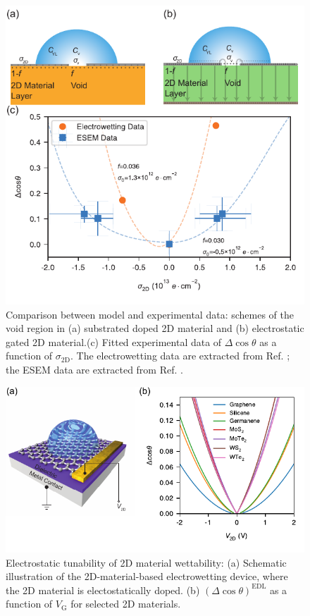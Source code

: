 \documentclass[journal=ancac3,manuscript=article,email=true,hyperref=true,keywords=true]{achemso}
\begin{document}
\begin{figure}[htbp]
\centering
\includegraphics[width=0.95\linewidth]{../img/plot-fitting.pdf}
\caption{\label{fig:f-nc-exp}
Comparison between model and experimental data: schemes of the void region in (a) substrated doped 2D material and (b) electrostatic gated 2D material.(c) Fitted experimental data of \(\Delta\cos\theta\) as a function of \(\sigma_{\mathrm{2D}}\). The electrowetting data are extracted from Ref. ; the ESEM data are extracted from Ref. .}
\end{figure}


\begin{figure}[htbp]
\centering
\includegraphics[width=0.65\linewidth]{../img/dcos-all-2D.pdf}
\caption{\label{fig:dcos-all-2D}
Electrostatic tunability of 2D material wettability: (a) Schematic illustration of the 2D-material-based electrowetting device, where the 2D material is electostatically doped. (b) \((\Delta\cos\theta)^{\mathrm{EDL}}\) as a function of \(V_{\mathrm{G}}\) for selected 2D materials.}
\end{figure}
\end{document}
